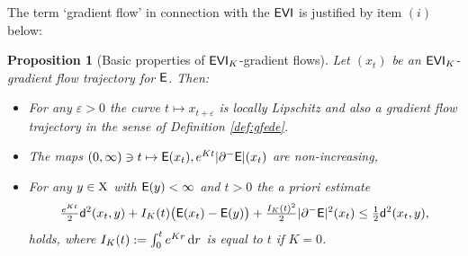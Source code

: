 \documentclass[11pt]{article}
\numberwithin{equation}{section}
\newtheorem{proposition}[theorem]{Proposition}
\newcommand{\X}{{\rm X}}
\newcommand{\sfd}{{\sf d}}
\renewcommand{\d}{{\rm d}}
\newcommand{\eps}{\varepsilon}
\newcommand{\E}{{\sf E}} %
\newcommand{\EVI}{{\sf EVI}}
\begin{document}
The term `gradient flow' in connection with the $\EVI$ is justified by item $(i)$ below:
\begin{proposition}[Basic properties of $\EVI_K$-gradient flows]\label{prop:pasevi} Let $(x_t)$ be an $\EVI_K$-gradient flow trajectory for $\E$. Then:
\begin{itemize}
\item[i)] For any $\eps>0$ the curve $t\mapsto x_{t+\eps}$ is locally Lipschitz and also a gradient flow trajectory in the sense of Definition \ref{def:gfede}. 
\item[ii)] The maps $(0,\infty)\ni t\mapsto \E(x_t), e^{Kt}|\partial^-\E|(x_t)$ are non-increasing,
\item[iii)] For any $y\in\X$ with $\E(y)<\infty $ and $t>0$ the a priori estimate
\begin{equation}
\label{eq:aprioriEVI}
\tfrac{e^{Kt}}2\sfd^2(x_t,y)+ I_K(t)\big(\E(x_t)-\E(y)\big)+\tfrac{I_K(t)^2}2|\partial^-\E|^2(x_t)\leq\tfrac12\sfd^2(x_t,y),
\end{equation}
holds, where $I_K(t):=\int_0^te^{Kr}\,\d r$ is equal to $t$ if $K=0$.
\end{itemize}
\end{proposition}
\end{document}
